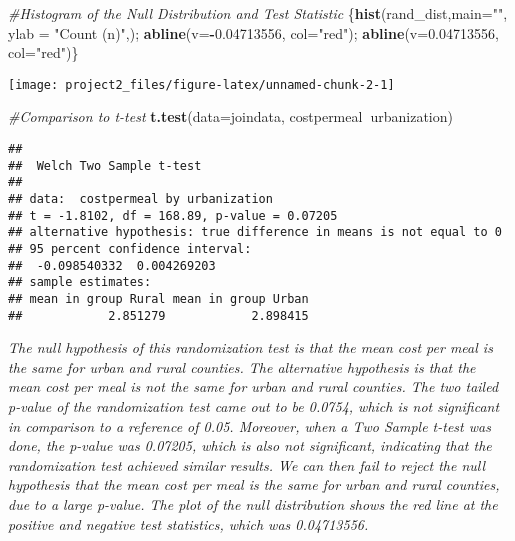 \documentclass[]{article}
\newenvironment{Shaded}{\begin{snugshade}}{\end{snugshade}}
\newcommand{\CommentTok}[1]{\textcolor[rgb]{0.56,0.35,0.01}{\textit{#1}}}
\newcommand{\DataTypeTok}[1]{\textcolor[rgb]{0.13,0.29,0.53}{#1}}
\newcommand{\FloatTok}[1]{\textcolor[rgb]{0.00,0.00,0.81}{#1}}
\newcommand{\KeywordTok}[1]{\textcolor[rgb]{0.13,0.29,0.53}{\textbf{#1}}}
\newcommand{\NormalTok}[1]{#1}
\newcommand{\OperatorTok}[1]{\textcolor[rgb]{0.81,0.36,0.00}{\textbf{#1}}}
\newcommand{\StringTok}[1]{\textcolor[rgb]{0.31,0.60,0.02}{#1}}
\begin{document}
\begin{Shaded}
\begin{Highlighting}[]
\CommentTok{#Histogram of the Null Distribution and Test Statistic}
\NormalTok{\{}\KeywordTok{hist}\NormalTok{(rand_dist,}\DataTypeTok{main=}\StringTok{""}\NormalTok{, }\DataTypeTok{ylab =} \StringTok{"Count (n)"}\NormalTok{,); }\KeywordTok{abline}\NormalTok{(}\DataTypeTok{v=}\OperatorTok{-}\FloatTok{0.04713556}\NormalTok{,  }\DataTypeTok{col=}\StringTok{"red"}\NormalTok{); }
  \KeywordTok{abline}\NormalTok{(}\DataTypeTok{v=}\FloatTok{0.04713556}\NormalTok{,  }\DataTypeTok{col=}\StringTok{"red"}\NormalTok{)\}}
\end{Highlighting}
\end{Shaded}

\begin{center}\texttt{[image: project2\_files/figure-latex/unnamed-chunk-2-1]} \end{center}

\begin{Shaded}
\begin{Highlighting}[]
\CommentTok{#Comparison to t-test}
\KeywordTok{t.test}\NormalTok{(}\DataTypeTok{data=}\NormalTok{joindata, costpermeal}\OperatorTok{~}\NormalTok{urbanization)}
\end{Highlighting}
\end{Shaded}

\begin{verbatim}
## 
##  Welch Two Sample t-test
## 
## data:  costpermeal by urbanization
## t = -1.8102, df = 168.89, p-value = 0.07205
## alternative hypothesis: true difference in means is not equal to 0
## 95 percent confidence interval:
##  -0.098540332  0.004269203
## sample estimates:
## mean in group Rural mean in group Urban 
##            2.851279            2.898415
\end{verbatim}

\emph{The null hypothesis of this randomization test is that the mean
cost per meal is the same for urban and rural counties. The alternative
hypothesis is that the mean cost per meal is not the same for urban and
rural counties. The two tailed p-value of the randomization test came
out to be 0.0754, which is not significant in comparison to a reference
of 0.05. Moreover, when a Two Sample t-test was done, the p-value was
0.07205, which is also not significant, indicating that the
randomization test achieved similar results. We can then fail to reject
the null hypothesis that the mean cost per meal is the same for urban
and rural counties, due to a large p-value. The plot of the null
distribution shows the red line at the positive and negative test
statistics, which was 0.04713556. }
\end{document}
